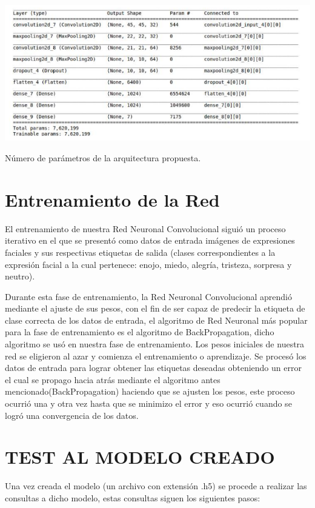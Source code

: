 \begin{table}[H]
    \centering
    \includegraphics[width=160mm]{./Imagenes/parametros.png} 
    \caption{Número de parámetros de la arquitectura propuesta.}
    \label{tab:parametros}
\end{table}

	
\section{Entrenamiento de la Red}
El entrenamiento de nuestra Red Neuronal Convolucional siguió un proceso iterativo en el que se presentó como datos de entrada imágenes de expresiones faciales y sus respectivas etiquetas de salida (clases correspondientes a la expresión facial a la cual pertenece: enojo, miedo, alegría, tristeza, sorpresa y neutro).

Durante esta fase de entrenamiento, la Red Neuronal Convolucional aprendió mediante el ajuste de sus pesos, con el fin de ser capaz de predecir la etiqueta de clase correcta de los datos de entrada, el algoritmo de Red Neuronal más popular para la fase de entrenamiento es el algoritmo de BackPropagation, dicho algoritmo se usó en nuestra fase de entrenamiento. Los pesos iniciales de nuestra red se eligieron al azar y comienza el entrenamiento o aprendizaje. Se procesó los datos de entrada para lograr obtener las etiquetas deseadas obteniendo un error el cual se propago hacia atrás mediante el algoritmo antes mencionado(BackPropagation) haciendo que se ajusten los pesos, este proceso ocurrió una y otra vez hasta que se minimizo el error y eso ocurrió cuando se logró una convergencia de los datos.

\section{TEST AL MODELO CREADO}
Una vez creada el modelo (un archivo con extensión .h5) se procede a realizar las
consultas a dicho modelo, estas consultas siguen los siguientes pasos:


